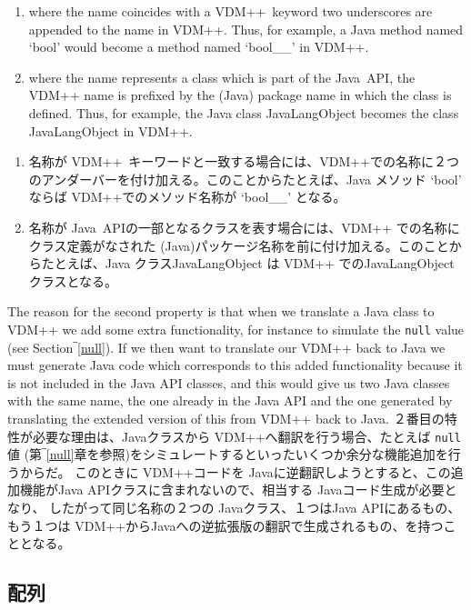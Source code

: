 \documentclass[\pformat,12pt]{jarticle}
\newcommand{\JAVA}{Java}
\newcommand{\VDM}{VDM++}
\begin{document}
\begin{enumerate}
\item where the name coincides with a \VDM\ keyword two underscores
  are appended to the name in \VDM. Thus, for example, a Java method
  named `bool' would become a method named `bool\_\_' in VDM++. 
\item where the name represents a class which is part of the \JAVA\
  API, the VDM++ name is prefixed by the (Java) package name in which
  the class is defined. Thus, for example, the Java class JavaLangObject
  becomes the class JavaLangObject in VDM++. 
\end{enumerate}
\begin{enumerate}
\item 名称が \VDM\ キーワードと一致する場合には、\VDM での名称に２つのアンダーバーを付け加える。このことからたとえば、Java メソッド `bool' ならば VDM++でのメソッド名称が `bool\_\_' となる。
\item 名称が \JAVA\ APIの一部となるクラスを表す場合には、VDM++ での名称にクラス定義がなされた (Java)パッケージ名称を前に付け加える。このことからたとえば、Java クラスJavaLangObject は VDM++ でのJavaLangObjectクラスとなる。
\end{enumerate}

The reason for the second property is that when we translate a Java
class to VDM++ we add some extra functionality, for instance to
simulate the \texttt{null} value (see Section‾\ref{null}). If we then
want to translate our VDM++ back to Java we must generate Java code
which corresponds to this added functionality because it is not
included in the Java API classes, and this would give us two Java
classes with the same name, the one already in the Java API and the
one generated by translating the extended version of this from VDM++
back to Java.  
２番目の特性が必要な理由は、Javaクラスから VDM++へ翻訳を行う場合、たとえば \texttt{null} 値 (第‾\ref{null}章を参照)をシミュレートするといったいくつか余分な機能追加を行うからだ。
このときに VDM++コードを Javaに逆翻訳しようとすると、この追加機能がJava APIクラスに含まれないので、相当する Javaコード生成が必要となり、 したがって同じ名称の２つの Javaクラス、１つはJava APIにあるもの、もう１つは VDM++からJavaへの逆拡張版の翻訳で生成されるもの、を持つこととなる。

\subsection{配列}\label{arrays}
\end{document}
